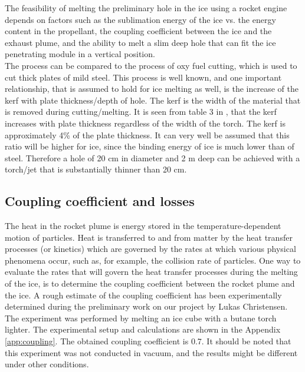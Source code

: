 The feasibility of melting the preliminary hole in the ice using a rocket engine depends on factors such as the sublimation energy of the ice vs. the energy content in the propellant, the coupling coefficient between the ice and the exhaust plume, and the ability to melt a slim deep hole that can fit the ice penetrating module in a vertical position. \\
The process can be compared to the process of oxy fuel cutting, which is used to cut thick plates of mild steel. This process is well known, and one important relationship, that is assumed to hold for ice melting as well, is the increase of the kerf with plate thickness/depth of hole. The kerf is the width of the material that is removed during cutting/melting. It is seen from table 3 in \cite{oxy_fuel}, that the kerf increases with plate thickness regardless of the width of the torch. The kerf is approximately 4\% of the plate thickness. It can very well be assumed that this ratio will be higher for ice, since the binding energy of ice is much lower than of steel. Therefore a hole of 20 cm in diameter and 2 m deep can be achieved  with a torch/jet that is substantially thinner than 20 cm. 

\subsection{Coupling coefficient and losses}
The heat in the rocket plume is energy stored in the temperature-dependent motion of particles. Heat is transferred to and from matter by the heat transfer processes (or kinetics) which are governed by the rates at which various physical phenomena occur, such as, for example, the collision rate of particles. One way to evaluate the rates that will govern the heat transfer processes during the melting of the ice, is to determine the coupling coefficient between the rocket plume and the ice. A rough estimate of the coupling coefficient has been experimentally determined during the preliminary work on our project by Lukas Christensen. The experiment was performed by melting an ice cube with a butane torch lighter. The experimental setup and calculations are shown in the Appendix \ref{app:coupling}. The obtained coupling coefficient is 0.7. It should be noted that this experiment was not conducted in vacuum, and the results might be different under other conditions. \\


